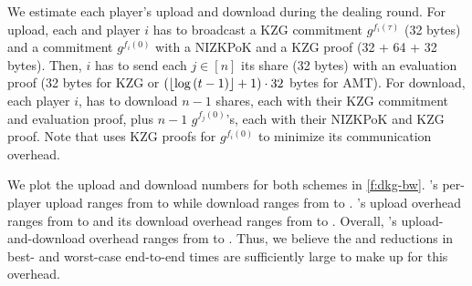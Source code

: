We estimate each player's upload and download during the dealing round.
For upload, each \ejfdkg and \ourdkg player $i$ has to broadcast a KZG commitment $g^{f_i(\tau)}$ (32 bytes) and a commitment $g^{f_i(0)}$ with a NIZKPoK and a KZG proof (32 + 64 + 32 bytes).
Then, $i$ has to send each $j\in[n]$ its share (32 bytes) with an evaluation proof (32 bytes for KZG or $(\lfloor\log{(t-1)}\rfloor + 1) \cdot 32$ bytes for AMT).
For download, each player $i$, has to download $n-1$ shares, each with their KZG commitment and evaluation proof, plus $n-1$ $g^{f_j(0)}$'s, each with their NIZKPoK and KZG proof.
Note that \ourdkg uses KZG proofs for $g^{f_i(0)}$ to minimize its communication overhead.

We plot the upload and download numbers for both schemes in \cref{f:dkg-bw}.
\ejfdkg's per-player upload ranges from  to  while download ranges from  to .
\ourvss's upload overhead ranges from  to  and its download overhead ranges from  to .
Overall, \ourvss's upload-and-download overhead ranges from  to .
Thus, we believe the  and  reductions in best- and worst-case end-to-end times are sufficiently large to make up for this overhead.